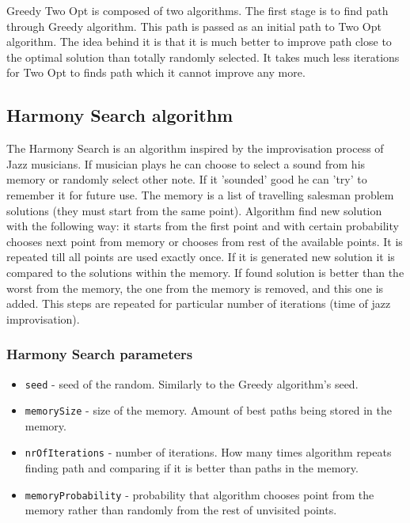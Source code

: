 \documentclass[titlepage]{article}
\begin{document}
Greedy Two Opt is composed of two algorithms. The first stage is to find path through Greedy algorithm. This path is passed as an initial path to Two Opt algorithm. The idea behind it is that it is much better to improve path close to the optimal solution than totally randomly selected. It takes much less iterations for Two Opt to finds path which it cannot improve any more. 

\subsection{Harmony Search algorithm}

The Harmony Search is an algorithm inspired by the improvisation process of Jazz musicians. If musician plays he can choose to select a sound from his memory or randomly select other note. If it 'sounded' good he can 'try' to remember it for future use. The memory is a list of travelling salesman problem solutions (they must start from the same point). Algorithm find new solution with the following way: it starts from the first point and with certain probability chooses next point from memory or chooses from rest of the available points. It is repeated till all points are used exactly once. If it is generated new solution it is compared to the solutions within the memory. If found solution is better than the worst from the memory, the one from the memory is removed, and this one is added. This steps are repeated for particular number of iterations (time of jazz improvisation).

\subsubsection{Harmony Search parameters}

\begin{itemize}
	\item \texttt{seed} - seed of the random. Similarly to the Greedy algorithm's seed.
	
	\item \texttt{memorySize} - size of the memory. Amount of best paths being stored in the memory.
	
	\item \texttt{nrOfIterations} - number of iterations. How many times algorithm repeats finding path and comparing if it is better than paths in the memory.
	
	\item \texttt{memoryProbability} - probability that algorithm chooses point from the memory rather than randomly from the rest of unvisited points.
\end{itemize}
\end{document}

